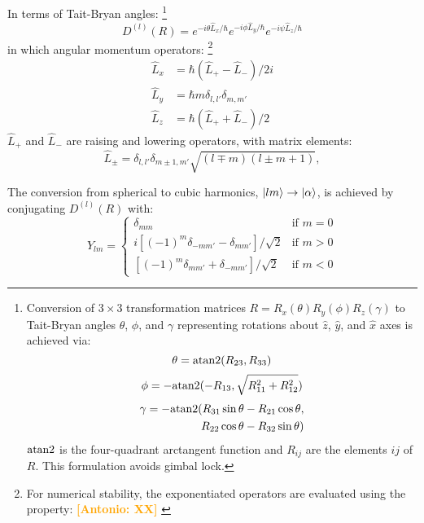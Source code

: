 \documentclass[twocolumn,showpacs,preprintnumbers,superscriptaddress,prb,floatfix,aps,10pt]{revtex4-1}
\newcommand{\abmei}[1]{\textcolor{orange}{ \bf [Antonio: #1] }}
\newcommand*{\wignerDl}{D^{(l)}(R)}
\newcommand*{\x}{\times}
\begin{document}
In terms of Tait-Bryan angles:
%
\footnote{
Conversion of $3\x3$ transformation matrices $R = R_x(\theta)R_y(\phi)R_z(\gamma)$ to Tait-Bryan angles $\theta$, $\phi$, and $\gamma$ representing rotations about $\hat{z}$, $\hat{y}$, and $\hat{x}$ axes is achieved via:
\begin{equation}
\theta = {\rm atan2}(R_{23},R_{33})
\end{equation}
\begin{equation}
\phi   =-{\rm atan2}(-R_{13},\sqrt{R_{11}^2+R_{12}^2})
\end{equation}
\begin{equation}
\begin{split}
\gamma =-{\rm atan2}(R_{31}\sin{\theta}-R_{21}\cos{\theta}, \\ 
       \quad         R_{22}\cos{\theta}-R_{32}\sin{\theta})
\end{split}
\end{equation}
${\rm atan2}$ is the four-quadrant arctangent function and $R_{ij}$ are the elements $ij$ of $R$. This formulation avoids gimbal lock.} 
%
\begin{equation}
\wignerDl = e^{-i\theta\hat{L}_x/\hbar} e^{-i\phi\hat{L}_y/\hbar} e^{-i\psi\hat{L}_z/\hbar}
\end{equation}
%
in which angular momentum operators:
%
\footnote{For numerical stability, the exponentiated operators are evaluated using the property: \abmei{XX} } \cite{shankar_fundamentals_2014}
%
\begin{align}
\label{eq:angular_momenta}
\hat{L}_x & = \hbar (\hat{L}_{+}-\hat{L}_{-})/2i \\
\hat{L}_y & = \hbar m \delta_{l,l'}\delta_{m,m'} \\
\hat{L}_z & = \hbar (\hat{L}_{+}+\hat{L}_{-})/2
\end{align}
$\hat{L}_+$ and $\hat{L}_-$ are raising and lowering operators, with matrix elements:
\begin{equation}
\label{eq:raising_lowering_operator}
\hat{L}_{\pm} = \delta_{l,l'}\delta_{m\pm1,m'} \sqrt{(l\mp m)(l\pm m+1)},
\end{equation}









The conversion from spherical to cubic harmonics, $\ket{lm} \rightarrow \ket{\alpha}$, is achieved by conjugating $\wignerDl$ with:
\begin{equation}
\label{eq:cubic_harmonics}
Y_{lm} = 
\begin{cases}
\delta_{mm}                                      & \text{if } m = 0 \\
 i[(-1)^{m}\delta_{-mm'}-\delta_{ mm'}]/\sqrt{2} & \text{if } m > 0 \\
  [(-1)^{m}\delta_{ mm'}+\delta_{-mm'}]/\sqrt{2} & \text{if } m < 0
\end{cases}
\end{equation}
\end{document}
